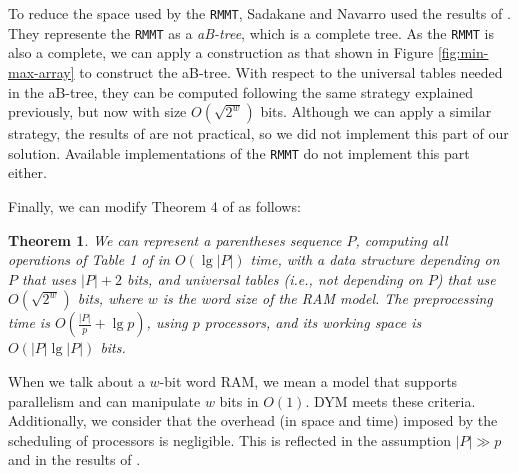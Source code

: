 To reduce the space used by the {\tt RMMT}, Sadakane and Nava\-rro used
the results of \cite{Patrascu:2008:SUC:1470582.1470670}. They
represente the {\tt RMMT} as a \emph{aB-tree}, which is a complete
tree. As the {\tt RMMT} is also a complete, we can apply a
construction as that shown in Figure \ref{fig:min-max-array} to
construct the aB-tree. With respect to the universal tables needed in
the aB-tree, they can be computed following the same strategy
explained previously, but now with size $O(\sqrt{2^{w}})$
bits. Although we can apply a similar strategy, the results of
\cite{Patrascu:2008:SUC:1470582.1470670} are not practical, so we did
not implement this part of our solution. Available implementations of
the {\tt RMMT} do not implement this part either.

Finally, we can modify Theorem 4 of
\cite{Navarro:2014:FFS:2620785.2601073} as follows:

\newtheorem{theorem}{Theorem}
\begin{theorem}
  We can represent a parentheses sequence $P$, computing all
  operations of Table 1 of \cite{Navarro:2014:FFS:2620785.2601073}
  in $O(\lg |P|)$ time, with a data
  structure depending on $P$ that uses $|P|+2$ bits, and universal
  tables (i.e., not depending on $P$) that use $O(\sqrt{2^{w}})$
  bits, where $w$ is the word size of the RAM model. The preprocessing
  time is $O(\frac{|P|}{p} + \lg p)$, using $p$
  processors, and its working space is $O(|P|\lg |P|)$ bits.
\end{theorem}
			
				
When we talk about a $w$-bit word RAM, we mean a model that supports
parallelism and can manipulate $w$ bits in $O(1)$. DYM meets these
criteria. Additionally, we consider that the overhead (in space and
time) imposed by the scheduling of processors is negligible. This is
reflected in the assumption $ |P|\gg p$ and in the results of
\cite{Blumofe:1999:SMC:324133.324234}.

